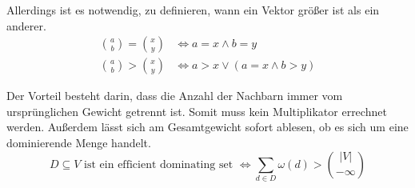 Allerdings ist es notwendig, zu definieren, wann ein Vektor größer ist als ein anderer.
    \begin{align*}
        \binom{a}{b} = \binom{x}{y} &\Leftrightarrow a=x \land b =y \\
        \binom{a}{b} > \binom{x}{y} &\Leftrightarrow a>x \lor (a=x \land b>y)
    \end{align*}

Der Vorteil besteht darin, dass die Anzahl der Nachbarn immer vom ursprünglichen Gewicht getrennt ist. Somit muss kein Multiplikator errechnet werden. Außerdem lässt sich am Gesamtgewicht sofort ablesen, ob es sich um eine dominierende Menge handelt.
\[ D \subseteq V \text{ ist ein efficient dominating set } \Leftrightarrow \sum_{d \in D} \omega(d) > \binom{|V|}{-\infty} \]